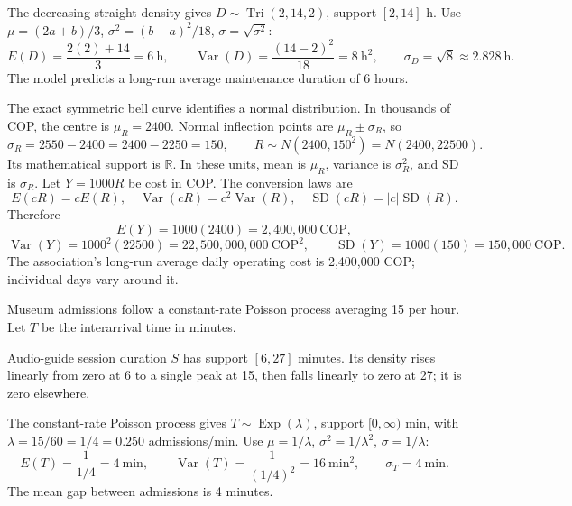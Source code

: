 The decreasing straight density gives $D\sim\operatorname{Tri}(2,14,2)$, support $[2,14]$ h.
Use $\mu=(2a+b)/3$, $\sigma^2=(b-a)^2/18$, $\sigma=\sqrt{\sigma^2}$:
\[E(D)=\frac{2(2)+14}3=6\ \text{h},\qquad\operatorname{Var}(D)=\frac{(14-2)^2}{18}=8\ \text{h}^2,\qquad\sigma_D=\sqrt8\approx2.828\ \text{h}.\]
The model predicts a long-run average maintenance duration of 6 hours.

The exact symmetric bell curve identifies a normal distribution. In thousands of COP, the centre is $\mu_R=2400$.
Normal inflection points are $\mu_R\pm\sigma_R$, so
\[\sigma_R=2550-2400=2400-2250=150,\qquad R\sim N(2400,150^2)=N(2400,22500).\]
Its mathematical support is $\mathbb R$. In these units, mean is $\mu_R$, variance is $\sigma_R^2$, and SD is $\sigma_R$.
Let $Y=1000R$ be cost in COP. The conversion laws are
\[E(cR)=cE(R),\quad\operatorname{Var}(cR)=c^2\operatorname{Var}(R),\quad\operatorname{SD}(cR)=|c|\operatorname{SD}(R).\]
Therefore
\[E(Y)=1000(2400)=2{,}400{,}000\ \text{COP},\]
\[\operatorname{Var}(Y)=1000^2(22500)=22{,}500{,}000{,}000\ \text{COP}^2,\qquad\operatorname{SD}(Y)=1000(150)=150{,}000\ \text{COP}.\]
The association's long-run average daily operating cost is 2,400,000 COP; individual days vary around it.

Museum admissions follow a constant-rate Poisson process averaging 15 per hour. Let $T$ be the interarrival time in minutes.

Audio-guide session duration $S$ has support $[6,27]$ minutes. Its density rises linearly from zero at 6 to a single peak at 15, then falls linearly to zero at 27; it is zero elsewhere.


The constant-rate Poisson process gives $T\sim\operatorname{Exp}(\lambda)$, support $[0,\infty)$ min, with $\lambda=15/60=1/4=0.250$ admissions/min.
Use $\mu=1/\lambda$, $\sigma^2=1/\lambda^2$, $\sigma=1/\lambda$:
\[E(T)=\frac1{1/4}=4\ \text{min},\qquad\operatorname{Var}(T)=\frac1{(1/4)^2}=16\ \text{min}^2,\qquad\sigma_T=4\ \text{min}.\]
The mean gap between admissions is 4 minutes.

